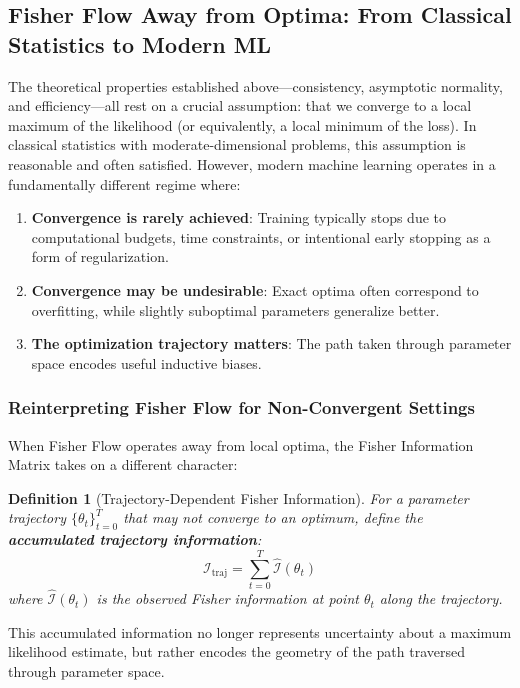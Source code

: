 \documentclass[11pt]{article}
\newtheorem{definition}[theorem]{Definition}
\begin{document}
\subsection{Fisher Flow Away from Optima: From Classical Statistics to Modern ML}

The theoretical properties established above—consistency, asymptotic normality, and efficiency—all rest on a crucial assumption: that we converge to a local maximum of the likelihood (or equivalently, a local minimum of the loss). In classical statistics with moderate-dimensional problems, this assumption is reasonable and often satisfied. However, modern machine learning operates in a fundamentally different regime where:
\begin{enumerate}
\item \textbf{Convergence is rarely achieved}: Training typically stops due to computational budgets, time constraints, or intentional early stopping as a form of regularization.
\item \textbf{Convergence may be undesirable}: Exact optima often correspond to overfitting, while slightly suboptimal parameters generalize better.
\item \textbf{The optimization trajectory matters}: The path taken through parameter space encodes useful inductive biases.
\end{enumerate}

\subsubsection{Reinterpreting Fisher Flow for Non-Convergent Settings}

When Fisher Flow operates away from local optima, the Fisher Information Matrix takes on a different character:

\begin{definition}[Trajectory-Dependent Fisher Information]
For a parameter trajectory $\{\theta_t\}_{t=0}^T$ that may not converge to an optimum, define the \textbf{accumulated trajectory information}:
\begin{equation}
\mathcal{I}_{\text{traj}} = \sum_{t=0}^T \hat{\mathcal{I}}(\theta_t)
\end{equation}
where $\hat{\mathcal{I}}(\theta_t)$ is the observed Fisher information at point $\theta_t$ along the trajectory.
\end{definition}

This accumulated information no longer represents uncertainty about a maximum likelihood estimate, but rather encodes the geometry of the path traversed through parameter space.
\end{document}
